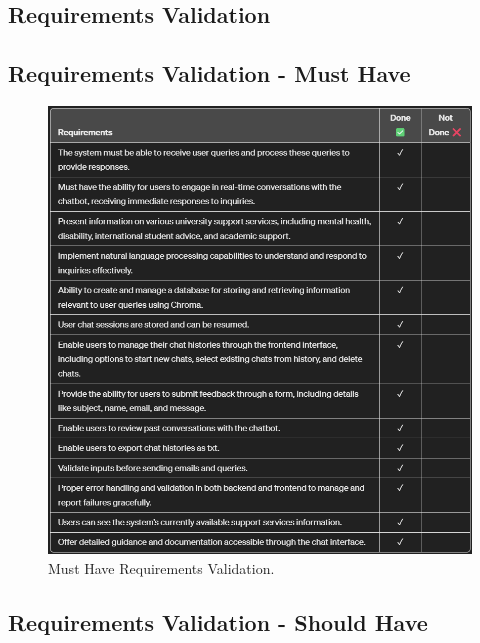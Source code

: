 \documentclass{l4proj}
\begin{document}
\begin{appendices}
\chapter{Requirements Validation}
\label{ch:Requirements Validation}

\section*{Requirements Validation - Must Have}

\begin{figure}[h!]
  \centering
  \begin{adjustbox}{center,max height=0.75\textheight, max width=\linewidth}
    \includegraphics{images/musthave.png}
  \end{adjustbox}
  \caption{Must Have Requirements Validation.}
\end{figure}


\section*{Requirements Validation - Should Have}


\end{appendices}
\end{document}
